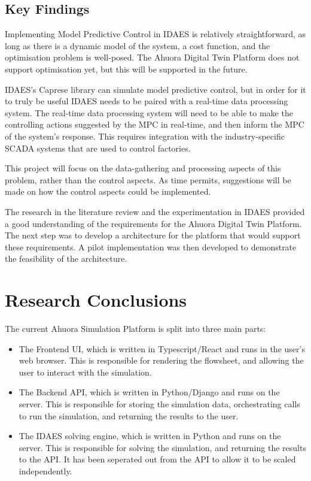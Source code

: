 \documentclass[12pt]{report}
\begin{document}
\subsection{Key Findings} \label{sec:optimisationcontrol}

Implementing Model Predictive Control in IDAES is relatively straightforward, as long as there is a dynamic model of the system, a cost function, and the optimisation problem is well-posed. The Ahuora Digital Twin Platform does not support optimisation yet, but this will be supported in the future.

IDAES's Caprese library can simulate model predictive control, but in order for it to truly be useful IDAES needs to be paired with a real-time data processing system. The real-time data processing system will need to be able to make the controlling actions suggested by the MPC in real-time, and then inform the MPC of the system's response. This requires integration with the industry-specific SCADA systems that are used to control factories.

This project will focus on the data-gathering and processing aspects of this problem, rather than the control aspects. As time permits, suggestions will be made on how the control aspects could be implemented.



The research in the literature review and the experimentation in IDAES provided a good understanding of the requirements for the Ahuora Digital Twin Platform. The next step was to develop a architecture for the platform that would support these requirements. A pilot implementation was then developed to demonstrate the feasibility of the architecture.

\section{Research Conclusions} \label{sec:researchconclusions}

The current Ahuora Simulation Platform is split into three main parts:

\begin{itemize}
    \item The Frontend UI, which is written in Typescript/React and runs in the user's web browser. This is responsible for rendering the flowsheet, and allowing the user to interact with the simulation.
    \item The Backend API, which is written in Python/Django and runs on the server. This is responsible for storing the simulation data, orchestrating calls to run the simulation, and returning the results to the user.
    \item The IDAES solving engine, which is written in Python and runs on the server. This is responsible for solving the simulation, and returning the results to the API. It has been seperated out from the API to allow it to be scaled independently.
\end{itemize}
\end{document}
